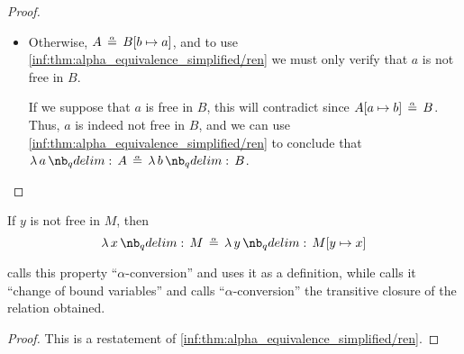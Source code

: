 \begin{proof}
\begin{itemize}
    \item Otherwise, \( A \aequiv B[b \mapsto a] \), and to use \ref{inf:thm:alpha_equivalence_simplified/ren} we must only verify that \( a \) is not free in \( B \).

    If we suppose that \( a \) is free in \( B \), this will contradict  since \( A[a \mapsto b] \aequiv B \). Thus, \( a \) is indeed not free in \( B \), and we can use \ref{inf:thm:alpha_equivalence_simplified/ren} to conclude that \( \qabs a A \aequiv \qabs b B \).
  \end{itemize}
\end{proof}

\begin{corollary}\label{thm:alpha_conversion}
  If \( y \) is not free in \( M \), then
  \begin{equation}\label{eq:thm:alpha_conversion}
    \qabs x M \aequiv \qabs y M[y \mapsto x]
  \end{equation}
\end{corollary}
\begin{comments}
  \item {} calls this property \enquote{\( \alpha \)-conversion} and uses it as a definition, while  calls it \enquote{change of bound variables} and calls \enquote{\( \alpha \)-conversion} the transitive closure of the relation obtained.
\end{comments}
\begin{proof}
  This is a restatement of \ref{inf:thm:alpha_equivalence_simplified/ren}.
\end{proof}

